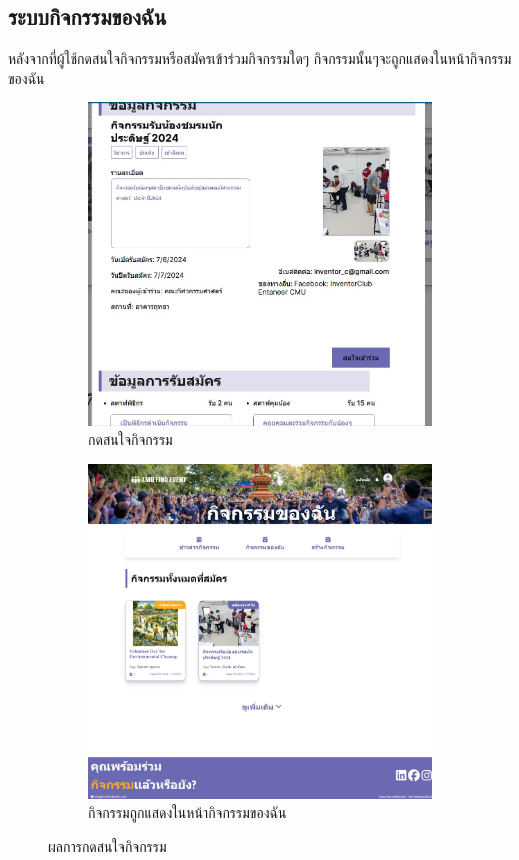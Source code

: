 \subsection{ระบบกิจกรรมของฉัน}
หลังจากที่ผู้ใช้กดสนใจกิจกรรมหรือสมัครเข้าร่วมกิจกรรมใดๆ กิจกรรมนั้นๆจะถูกแสดงในหน้ากิจกรรมของฉัน
\begin{figure}[h]
  \centering
  \begin{subfigure}[b]{0.4\linewidth}
    \includegraphics[width=\linewidth]{image/web/showInfo.jpg}
    \caption{กดสนใจกิจกรรม}
  \end{subfigure}
  \hfill
  \begin{subfigure}[b]{0.4\linewidth}
    \includegraphics[width=\linewidth]{image/web/myAct.jpeg}
    \caption{กิจกรรมถูกแสดงในหน้ากิจกรรมของฉัน}
  \end{subfigure}
  \caption{ผลการกดสนใจกิจกรรม}
  \label{fig:interests}
\end{figure}

